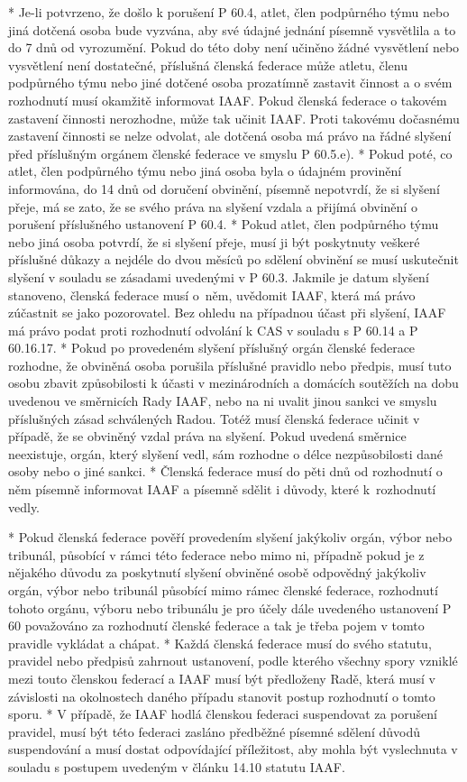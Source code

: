   * Je-li potvrzeno, že došlo k porušení P 60.4, atlet, člen podpůrného týmu nebo jiná dotčená osoba bude vyzvána, aby své údajné jednání písemně vysvětlila a to do 7 dnů od vyrozumění. Pokud do této doby není učiněno žádné vysvětlení nebo vysvětlení není dostatečné, příslušná členská federace může atletu, členu podpůrného týmu nebo jiné dotčené osoba prozatímně zastavit činnost a o svém rozhodnutí musí okamžitě informovat IAAF. Pokud členská federace o takovém zastavení činnosti nerozhodne, může tak učinit IAAF. Proti takovému dočasnému zastavení činnosti se nelze odvolat, ale dotčená osoba má právo na řádné slyšení před příslušným orgánem členské federace ve smyslu P 60.5.e).
  * Pokud poté, co atlet, člen podpůrného týmu nebo jiná osoba byla o údajném provinění informována, do 14 dnů od doručení obvinění, písemně nepotvrdí, že si slyšení přeje, má se zato, že se svého práva na slyšení vzdala a přijímá obvinění o porušení příslušného ustanovení P 60.4.
  * Pokud atlet, člen podpůrného týmu nebo jiná osoba potvrdí, že si slyšení přeje, musí ji být poskytnuty veškeré příslušné důkazy a nejdéle do dvou měsíců po sdělení obvinění se musí uskutečnit slyšení v souladu se zásadami uvedenými v P 60.3. Jakmile je datum slyšení stanoveno, členská federace musí o~něm, uvědomit IAAF, která má právo zúčastnit se jako pozorovatel. Bez ohledu na případnou účast při slyšení, IAAF má právo podat proti rozhodnutí odvolání k CAS v souladu s P 60.14 a P 60.16.17.
  * Pokud po provedeném slyšení příslušný orgán členské federace rozhodne, že obviněná osoba porušila příslušné pravidlo nebo předpis, musí tuto osobu zbavit způsobilosti k účasti v mezinárodních a domácích soutěžích na dobu uvedenou ve směrnicích Rady IAAF, nebo na ni uvalit jinou sankci ve smyslu příslušných zásad schválených Radou. Totéž musí členská federace učinit v případě, že se obviněný vzdal práva na slyšení. Pokud uvedená směrnice neexistuje, orgán, který slyšení vedl, sám rozhodne o délce nezpůsobilosti dané osoby nebo o jiné sankci.
  * Členská federace musí do pěti dnů od rozhodnutí o něm písemně informovat IAAF a písemně sdělit i důvody, které k~rozhodnutí vedly.
  \enditems

* Pokud členská federace pověří provedením slyšení jakýkoliv orgán, výbor nebo tribunál, působící v rámci této federace nebo mimo ni, případně pokud je z nějakého důvodu za poskytnutí slyšení obviněné osobě odpovědný jakýkoliv orgán, výbor nebo tribunál působící mimo rámec členské federace, rozhodnutí tohoto orgánu, výboru nebo tribunálu je pro účely dále uvedeného ustanovení P 60 považováno za rozhodnutí členské federace a tak je třeba pojem  v tomto pravidle vykládat a chápat.
* Každá členská federace musí do svého statutu, pravidel nebo předpisů zahrnout ustanovení, podle kterého všechny spory vzniklé mezi touto členskou federací a IAAF musí být předloženy Radě, která musí v závislosti na okolnostech daného případu stanovit postup rozhodnutí o tomto sporu.
* V případě, že IAAF hodlá členskou federaci suspendovat za porušení pravidel, musí být této federaci zasláno předběžné písemné sdělení důvodů suspendování a musí dostat odpovídající příležitost, aby mohla být vyslechnuta v souladu s postupem uvedeným v článku 14.10 statutu IAAF.

